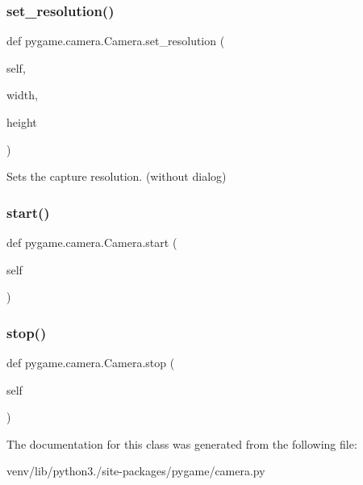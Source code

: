 \subsubsection{\texorpdfstring{set\+\_\+resolution()}{set\_resolution()}}
{\footnotesize\ttfamily def pygame.\+camera.\+Camera.\+set\+\_\+resolution (\begin{DoxyParamCaption}\item[{}]{self,  }\item[{}]{width,  }\item[{}]{height }\end{DoxyParamCaption})}

\begin{DoxyVerb}Sets the capture resolution. (without dialog)
\end{DoxyVerb}
 \mbox{\label{classpygame_1_1camera_1_1_camera_a845e1c713117a78978e2d9d39282a1e8}} 
\subsubsection{\texorpdfstring{start()}{start()}}
{\footnotesize\ttfamily def pygame.\+camera.\+Camera.\+start (\begin{DoxyParamCaption}\item[{}]{self }\end{DoxyParamCaption})}

\begin{DoxyVerb}\end{DoxyVerb}
 \mbox{\label{classpygame_1_1camera_1_1_camera_a4fb847d8e2b5a3f34d936b0b9c048a23}} 
\subsubsection{\texorpdfstring{stop()}{stop()}}
{\footnotesize\ttfamily def pygame.\+camera.\+Camera.\+stop (\begin{DoxyParamCaption}\item[{}]{self }\end{DoxyParamCaption})}

\begin{DoxyVerb}\end{DoxyVerb}
 

The documentation for this class was generated from the following file\+:\begin{DoxyCompactItemize}
\item 
venv/lib/python3./site-\/packages/pygame/camera.\+py\end{DoxyCompactItemize}
